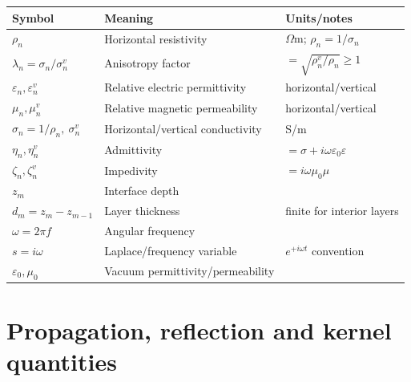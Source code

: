 \documentclass[12pt]{report}
\begin{document}
\begin{longtable}{lll}
\toprule
Symbol & Meaning & Units/notes \\
\midrule
\endhead
\(\rho_n\) & Horizontal resistivity & \(\Omega\)m; \(\rho_n=1/\sigma_n\) \\
\(\lambda_n=\sigma_n/\sigma^v_n\) & Anisotropy factor & \(=\sqrt{\rho^v_n/\rho_n}\geq 1\) \\
\(\varepsilon_n,\varepsilon^v_n\) & Relative electric permittivity & horizontal/vertical \\
\(\mu_n,\mu^v_n\) & Relative magnetic permeability & horizontal/vertical \\
\(\sigma_n=1/\rho_n,\ \sigma^v_n\) & Horizontal/vertical conductivity & S/m \\
\(\eta_n,\eta^v_n\) & Admittivity & \(=\sigma+i\omega\varepsilon_0\varepsilon\) \\
\(\zeta_n,\zeta^v_n\) & Impedivity & \(=i\omega\mu_0\mu\) \\
\(z_m\) & Interface depth & \\
\(d_m=z_m-z_{m-1}\) & Layer thickness & finite for interior layers \\
\(\omega=2\pi f\) & Angular frequency & \\
\(s=i\omega\) & Laplace/frequency variable & \(e^{+i\omega t}\) convention \\
\(\varepsilon_0,\mu_0\) & Vacuum permittivity/permeability & \\
\bottomrule
\end{longtable}

\section{Propagation, reflection and kernel quantities}
\end{document}
